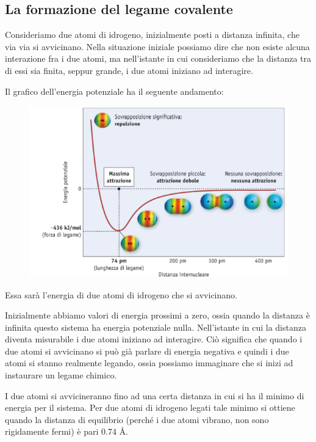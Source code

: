 \subsection{La formazione del legame covalente}
Consideriamo due atomi di idrogeno, inizialmente posti a distanza infinita, che via via si avvicinano. Nella situazione iniziale possiamo dire che non esiste alcuna interazione fra i due atomi, ma nell'istante in cui consideriamo che la distanza tra di essi sia finita, seppur grande, i due atomi iniziano ad interagire.

Il grafico dell'energia potenziale ha il seguente andamento:

\vspace{-0.4cm}\hspace{-1cm}\begin{figure}[htp]
    \centering
    \includegraphics[width=12cm]{immagini/energia-potenziale.png}
\end{figure}

\vspace{-0.3cm}Essa sarà l'energia di due atomi di idrogeno che si avvicinano.

Inizialmente abbiamo valori di energia prossimi a zero, ossia quando la distanza è infinita questo sistema ha energia potenziale nulla. Nell'istante in cui la distanza diventa misurabile i due atomi iniziano ad interagire. Ciò significa che quando i due atomi si avvicinano si può già parlare di energia negativa e quindi i due atomi si stanno realmente legando, ossia possiamo immaginare che si inizi ad instaurare un legame chimico.

I due atomi si avvicineranno fino ad una certa distanza in cui si ha il minimo di energia per il sistema. Per due atomi di idrogeno legati tale minimo si ottiene quando la distanza di equilibrio (perché i due atomi vibrano, non sono rigidamente fermi) è pari 0.74 Å.

